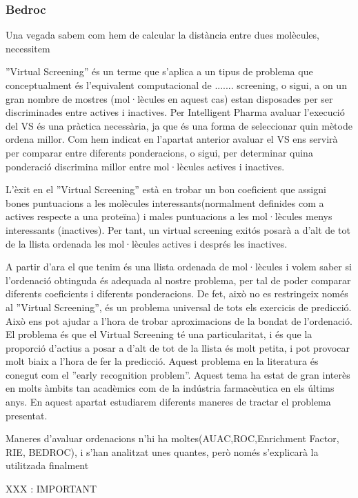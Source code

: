 \subsubsection{Bedroc}
\label{ssub:Bedroc}
Una vegada sabem com hem de calcular la distància entre dues molècules, necessitem 

''Virtual Screening'' és un terme que s'aplica a un tipus de problema
que conceptualment és l'equivalent computacional de ....... screening, %
o sigui, a on un gran nombre de mostres (mol·lècules en aquest cas)
estan disposades per ser discriminades entre actives i inactives. Per
Intelligent Pharma avaluar l'execució del VS és una pràctica
necessària, ja que és una forma de seleccionar quin mètode ordena
millor. Com hem indicat en l'apartat anterior avaluar el VS ens
servirà per comparar entre diferents ponderacions, o sigui, per
determinar quina ponderació discrimina millor entre mol·lècules
actives i inactives.

L'èxit en el ''Virtual Screening'' està en trobar un bon coeficient
que assigni bones puntuacions a les molècules interessants(normalment
definides com a actives respecte a una proteïna) i males puntuacions a
les mol·lècules menys interessants (inactives). Per tant, un virtual
screening exitós posarà a d'alt de tot de la llista ordenada les
mol·lècules actives i després les inactives.

A partir d'ara el que tenim és una llista ordenada de mol·lècules i
volem saber si l'ordenació obtinguda és adequada al nostre problema,
per tal de poder comparar diferents coeficients i diferents
ponderacions. De fet, això no es restringeix només al ''Virtual
Screening'', és un problema universal de tots els exercicis de
predicció. Això ens pot ajudar a l'hora de trobar aproximacions de la
bondat de l'ordenació. El problema és que el Virtual Screening té una
particularitat, i és que la proporció d'actius a posar a d'alt de tot
de la llista és molt petita, i pot provocar molt biaix a l'hora de fer
la predicció. Aquest problema en la literatura és conegut com el
''early recognition problem''. Aquest tema ha estat de gran interès en
molts àmbits tan acadèmics com de la indústria farmacèutica en els
últims anys. En aquest apartat estudiarem diferents maneres de tractar
el problema presentat.

Maneres d'avaluar ordenacions n'hi ha moltes(AUAC,ROC,Enrichment
Factor, RIE, BEDROC), i s'han analitzat unes quantes, però només
s'explicarà la utilitzada finalment

XXX : IMPORTANT

